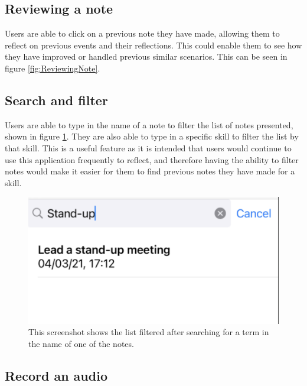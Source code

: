 \documentclass{l4proj}
\begin{document}
\subsection{Reviewing a note}

Users are able to click on a previous note they have made, allowing them to reflect on previous events and their reflections. This could enable them to see how they have improved or handled previous similar scenarios. This can be seen in figure \ref{fig:ReviewingNote}.

\subsection{Search and filter}

Users are able to type in the name of a note to filter the list of notes presented, shown in figure \ref{fig:SearchFilter}. They are also able to type in a specific skill to filter the list by that skill. This is a useful feature as it is intended that users would continue to use this application frequently to reflect, and therefore having the ability to filter notes would make it easier for them to find previous notes they have made for a skill. 

\begin{figure}
    \centering
    \includegraphics[scale=0.4]{images/SearchFilter.pdf}    
    \caption{This screenshot shows the list filtered after searching for a term in the name of one of the notes.}
    \label{fig:SearchFilter} 
\end{figure}

\subsection{Record an audio}
\end{document}
